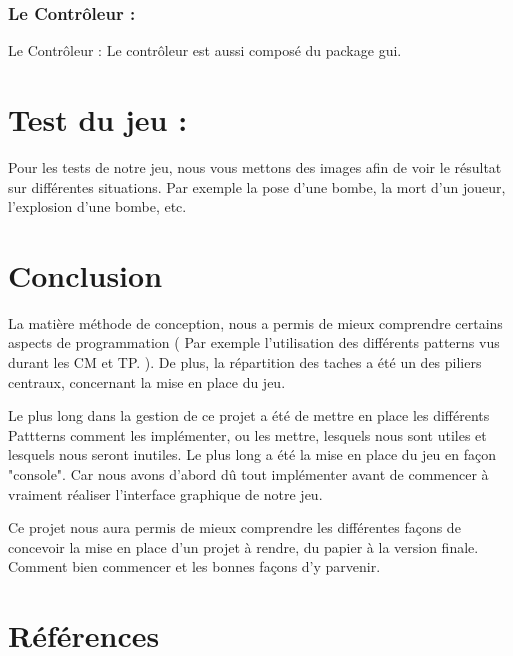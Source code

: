 \documentclass{article}
\begin{document}
\subsubsection{Le Contrôleur :}

\vspace{1\baselineskip}

Le Contrôleur : Le contrôleur est aussi composé du package gui.

\vspace{1\baselineskip}

\section{Test du jeu :}

Pour les tests de notre jeu, nous vous mettons des images afin de voir le résultat sur différentes situations. Par exemple la pose d'une bombe, la mort d'un joueur, l'explosion d'une bombe, etc.


\section{Conclusion}

La matière méthode de conception, nous a permis de mieux comprendre certains aspects de programmation ( Par exemple l'utilisation des différents patterns vus durant les CM et TP. ). De plus, la répartition des taches a été un des piliers centraux, concernant la mise en place du jeu.

\vspace{0.5\baselineskip}

Le plus long dans la gestion de ce projet a été de mettre en place les différents Pattterns comment les implémenter, ou les mettre, lesquels nous sont utiles et lesquels nous seront inutiles. Le plus long a été la mise en place du jeu en façon "console". Car nous avons d'abord dû tout implémenter avant de commencer à vraiment réaliser l'interface graphique de notre jeu.

\vspace{0.5\baselineskip}

Ce projet nous aura permis de mieux comprendre les différentes façons de concevoir la mise en place d'un projet à rendre, du papier à la version finale. Comment bien commencer et les bonnes façons d'y parvenir.


\section{Références}
\end{document}
